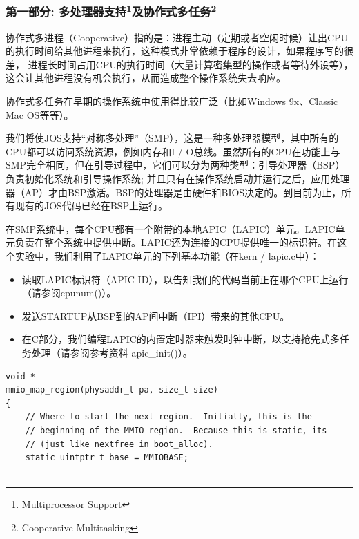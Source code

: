 \begin{ExerciseList}

\setcounter{Exercise}{0}

\subsubsection[第一部分: 多处理器支持及协作式多任务]{第一部分: 多处理器支持\footnote{Multiprocessor Support}及协作式多任务\footnote{Cooperative Multitasking} }

协作式多进程（Cooperative）指的是：进程主动（定期或者空闲时候）让出CPU的执行时间给其他进程来执行，这种模式非常依赖于程序的设计，如果程序写的很差， 进程长时间占用CPU的执行时间（大量计算密集型的操作或者等待外设等），这会让其他进程没有机会执行，从而造成整个操作系统失去响应。

协作式多任务在早期的操作系统中使用得比较广泛（比如Windows 9x、Classic Mac OS等等）。

我们将使JOS支持“对称多处理”（SMP），这是一种多处理器模型，其中所有的CPU都可以访问系统资源，例如内存和I / O总线。虽然所有的CPU在功能上与SMP完全相同，但在引导过程中，它们可以分为两种类型：引导处理器（BSP）负责初始化系统和引导操作系统; 并且只有在操作系统启动并运行之后，应用处理器（AP）才由BSP激活。BSP的处理器是由硬件和BIOS决定的。到目前为止，所有现有的JOS代码已经在BSP上运行。

在SMP系统中，每个CPU都有一个附带的本地APIC（LAPIC）单元。LAPIC单元负责在整个系统中提供中断。LAPIC还为连接的CPU提供唯一的标识符。在这个实验中，我们利用了LAPIC单元的下列基本功能（在kern / lapic.c中）：

\begin{itemize}
\item 读取LAPIC标识符（APIC ID），以告知我们的代码当前正在哪个CPU上运行（请参阅cpunum()）。
\item 发送STARTUP从BSP到的AP间中断（IPI）带来的其他CPU。
\item 在C部分，我们编程LAPIC的内置定时器来触发时钟中断，以支持抢先式多任务处理（请参阅参考资料 apic\_init()）。
\end{itemize}


\begin{verbatim}
void *
mmio_map_region(physaddr_t pa, size_t size)
{
    // Where to start the next region.  Initially, this is the
    // beginning of the MMIO region.  Because this is static, its
    // (just like nextfree in boot_alloc).
    static uintptr_t base = MMIOBASE;


\end{verbatim}
\end{ExerciseList}
